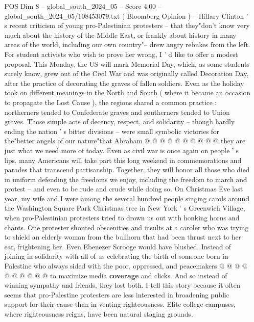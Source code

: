 \begin{textsample}{POS Dim 8 – global\_south\_2024\_05 – Score 4.00 – global\_south\_2024\_05/108453079.txt}  \label{ex:f8_pos_345}
( Bloomberg Opinion ) -- Hillary Clinton ' s recent criticism of young pro-Palestinian protesters -- that they"don't know very much about the history of the Middle East, or frankly about history in many areas of the world, including our own country"-- drew angry rebukes from the left.
For student activists who wish to prove her wrong, I ' d like to offer a modest proposal.
This Monday, the US will mark Memorial Day, which, as some students surely know, grew out of the Civil War and was originally called Decoration Day, after the practice of decorating the graves of fallen soldiers.
Even as the holiday took on different meanings in the North and South ( where it became an occasion to propagate the Lost Cause ), the regions shared a common practice : northerners tended to Confederate graves and southerners tended to Union graves.
Those simple acts of decency, respect, and solidarity -- though hardly ending the nation ' s bitter divisions -- were small symbolic victories for the"better angels of our nature"that Abraham @ @ @ @ @ @ @ @ @ @ they are just what we need more of today.
Even as civil war is once again on people ' s lips, many Americans will take part this long weekend in commemorations and parades that transcend partisanship.
Together, they will honor all those who died in uniform defending the freedoms we enjoy, including the freedom to march and protest -- and even to be rude and crude while doing so.
On Christmas Eve last year, my wife and I were among the several hundred people singing carols around the Washington Square Park Christmas tree in New York ' s Greenwich Village, when pro-Palestinian protesters tried to drown us out with honking horns and chants.
One protester shouted obscenities and insults at a caroler who was trying to shield an elderly woman from the bullhorn that had been thrust next to her ear, frightening her.
Even Ebenezer Scrooge would have blushed.
Instead of joining in solidarity with all of us celebrating the birth of someone born in Palestine who always sided with the poor, oppressed, and peacemakers @ @ @ @ @ @ @ @ @ @ to maximize media \textbf{coverage} and clicks.
And so instead of winning sympathy and friends, they lost both.
I tell this story because it often seems that pro-Palestine protesters are less interested in broadening public support for their cause than in venting righteousness.
Elite college campuses, where righteousness reigns, have been natural staging grounds.

\end{textsample}
